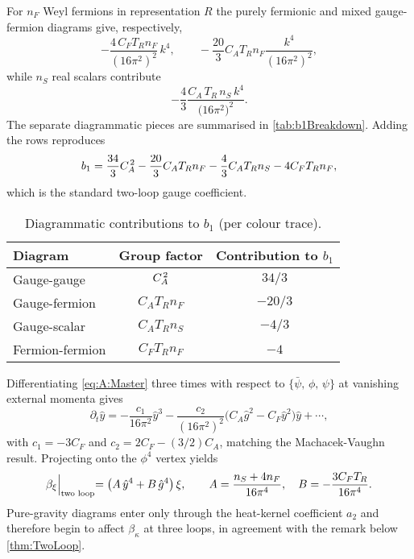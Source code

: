 \documentclass[pdflatex,sn-mathphys-num]{sn-jnl}
\theoremstyle{thmstyleone}
\theoremstyle{thmstyletwo}%
\theoremstyle{thmstylethree}%
\newcommand{\sm}{\hspace{.065em}}
\newcommand{\smexp}[1]{^{\sm #1}}
\begin{document}
For \(n_{F}\) Weyl fermions in representation \(R\) the purely fermionic
and mixed gauge-fermion diagrams give, respectively,
\[
  -\frac{4\,C_{F}T_{R}n_{F}}{(16\pi^{2})^{2}}\,k^{4},
  \qquad
  -\frac{20}{3}C_{A}T_{R}n_{F}\frac{k^{4}}{(16\pi^{2})^{2}},
\]
while \(n_{S}\) real scalars contribute
\[
  -\frac{4}{3}\frac{C_{A}\, T_{R}\, n_{S}\, k^{4}}{\bigl(16\pi^{2}\bigr)^{2}}.
\]
The separate diagrammatic pieces are summarised in
\autoref{tab:b1Breakdown}.  Adding the rows reproduces  
\[
  b_{1}
  =\frac{34}{3}C_{A}\smexp{\hspace{0.5px} 2}
   -\frac{20}{3}C_{A}T_{R}n_{F}
   -\frac43 C_{A}T_{R}n_{S}
   -4C_{F}T_{R}n_{F},
\]
which is the standard two-loop gauge coefficient.

\begin{table}[h]
\centering
\caption{Diagrammatic contributions to \(b_{1}\) (per colour
trace).}\label{tab:b1Breakdown}
\begin{tabular}{@{}lcc@{}}
  \toprule
  Diagram & Group factor & Contribution to \(b_{1}\) \\
  \midrule
  Gauge-gauge      & \(C_{A}\smexp{\hspace{0.5px} 2}\)           & \(34/3\) \\
  Gauge-fermion    & \(C_{A}T_{R}n_{F}\)     & \(-20/3\) \\
  Gauge-scalar     & \(C_{A}T_{R}n_{S}\)     & \(-4/3\)  \\
  Fermion-fermion  & \(C_{F}T_{R}n_{F}\)     & \(-4\)             \\
  \bottomrule
\end{tabular}
\end{table}

Differentiating \eqref{eq:A:Master} three times with respect to
\(\{\bar\psi,\,\phi,\,\psi\}\) at vanishing external momenta gives  
\[
  \partial_{t}\hat y
  =-\frac{c_{1}}{16\pi^{2}}\hat y^{3}
     -\frac{c_{2}}{(16\pi^{2})^{2}}
        \bigl(C_{A}\hat g^{2}-C_{F}\hat y^{2}\bigr)\hat y
     +\dotsb,
\]
with \(c_{1}=-3C_{F}\) and
\(c_{2}=2C_{F}-(3/2) C_{A}\), matching the Machacek-Vaughn result.
Projecting onto the \(\phi^{4}\) vertex yields
\[
  \beta_{\xi}\Bigl|_{\text{two loop}}
  =\bigl(A\,\hat y^{4}+B\,\hat g^{4}\bigr)\,\xi,
  \qquad
  A=\frac{n_{S}+4n_{F}}{16\pi^{4}},
  \quad
  B=-\frac{3C_{F}T_{R}}{16\pi^{4}}.
\]
Pure-gravity diagrams enter only through the heat-kernel coefficient
\(a_{2}\) and therefore begin to affect \(\beta_{\kappa}\) at three
loops, in agreement with the remark below \autoref{thm:TwoLoop}.
\end{document}
